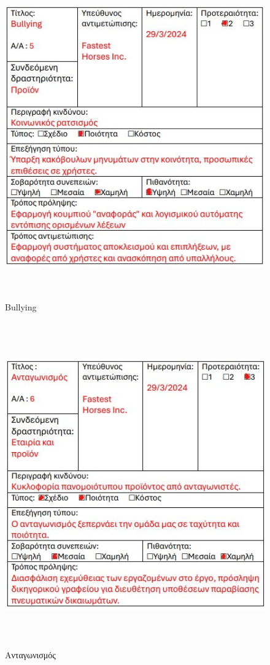 \begin{figure}[!htb]
  \centering
    \centering
    \includegraphics[width=\textwidth,height=14cm]{risk5.jpg}
    \caption{Bullying}
    \label{}
\end{figure}
\begin{figure}[!htb]
  \centering
    \centering
    \includegraphics[width=\textwidth,height=14cm]{risk6.jpg}
    \caption{Ανταγωνισμός}
    \label{}
\end{figure}
